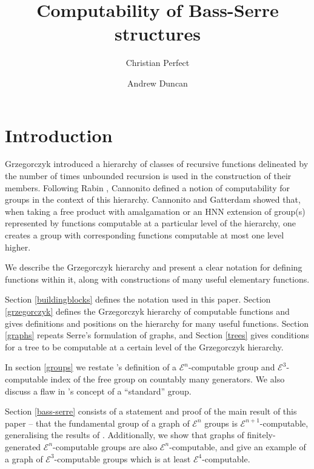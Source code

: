 \documentclass[a4paper]{article}
\newcommand{\grz}[1]{$\mathcal{E}^{#1}$}	%
\theoremstyle{plain}
\theoremstyle{definition}
\begin{document}
\title{Computability of Bass-Serre structures}
\author{Christian Perfect \and Andrew Duncan}
\maketitle

\section*{Introduction}

Grzegorczyk \cite{Grzegorczyk_1953} introduced a hierarchy of classes of recursive functions delineated by the number of times unbounded recursion is used in the construction of their members. Following Rabin \cite{Rabin_1960}, Cannonito \cite{Cannonito_1966} defined a notion of computability for groups in the context of this hierarchy. Cannonito and Gatterdam \cite{Cannonito_1973} \cite{Gatterdam_1973} showed that, when taking a free product with amalgamation or an HNN extension of group(s) represented by functions computable at a particular level of the hierarchy, one creates a group with corresponding functions computable at most one level higher.

We describe the Grzegorczyk hierarchy and present a clear notation for defining functions within it, along with constructions of many useful elementary functions. 

Section \ref{buildingblocks} defines the notation used in this paper. Section \ref{grzegorczyk} defines the Grzegorczyk hierarchy of computable functions and gives definitions and positions on the hierarchy for many useful functions. Section \ref{graphs} repeats Serre's formulation of graphs, and Section \ref{trees} gives conditions for a tree to be computable at a certain level of the Grzegorczyk hierarchy.

In section \ref{groups} we restate \cite{Cannonito_1966}'s definition of a \grz{n}-computable group and \grz{3}-computable index of the free group on countably many generators. We also discuss a flaw in \cite{Cannonito_1973}'s concept of a ``standard'' group.

Section \ref{bass-serre} consists of a statement and proof of the main result of this paper -- that the fundamental group of a graph of \grz{n} groups is \grz{n+1}-computable, generalising the results of \cite{Cannonito_1973}. Additionally, we show that graphs of finitely-generated \grz{n}-computable groups are also \grz{n}-computable, and give an example of a graph of \grz{3}-computable groups which is at least \grz{4}-computable.
\end{document}

